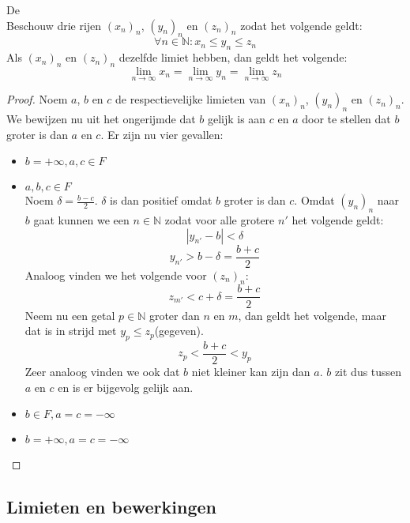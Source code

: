 \documentclass[main.tex]{subfiles}
\begin{document}
\begin{st}
  \label{st:insluitstelling}
  De \\
  Beschouw drie rijen $(x_{n})_{n}$, $(y_{n})_{n}$ en $(z_{n})_{n}$ zodat het volgende geldt:
  \[ \forall n\in \mathbb{N}: x_{n}\le y_{n}\le z_{n} \]
  Als $(x_{n})_{n}$ en $(z_{n})_{n}$ dezelfde limiet hebben, dan geldt het volgende:
  \[ \lim_{n\rightarrow \infty}x_{n} = \lim_{n\rightarrow \infty}y_{n} = \lim_{n\rightarrow \infty}z_{n} \]
  \begin{proof}
    Noem $a$, $b$ en $c$ de respectievelijke limieten van $(x_{n})_{n}$, $(y_{n})_{n}$ en $(z_{n})_{n}$.
    We bewijzen nu uit het ongerijmde dat $b$ gelijk is aan $c$ en $a$ door te stellen dat $b$ groter is dan $a$ en $c$.
    Er zijn nu vier gevallen:
    \begin{itemize}
    \item $b = +\infty, a,c \in F$\\
    \item $a,b,c\in F$\\
      Noem $\delta = \frac{b-c}{2}$.
      $\delta$ is dan positief omdat $b$ groter is dan $c$.
      Omdat $(y_{n})_{n}$ naar $b$ gaat kunnen we een $n\in \mathbb{N}$ zodat voor alle grotere $n'$ het volgende geldt:
      \[ |y_{n'}-b|<\delta \]
      \[ y_{n'} > b - \delta = \frac{b+c}{2} \]
      Analoog vinden we het volgende voor $(z_{n})_{n}$:
      \[ z_{m'} < c+\delta = \frac{b+c}{2} \]
      Neem nu een getal $p\in \mathbb{N}$ groter dan $n$ en $m$, dan geldt het volgende, maar dat is in strijd met $y_{p} \le z_{p}$(gegeven).
      \[ z_{p} < \frac{b+c}{2} < y_{p} \]
      Zeer analoog vinden we ook dat $b$ niet kleiner kan zijn dan $a$.
      $b$ zit dus tussen $a$ en $c$ en is er bijgevolg gelijk aan.
    \item $b\in F, a=c = -\infty$\\
    \item $b= +\infty, a=c=-\infty$\\
    \end{itemize}
  \end{proof}

\end{st}

\subsection{Limieten en bewerkingen}
\label{sec:limi-en-bewerk}
\end{document}
